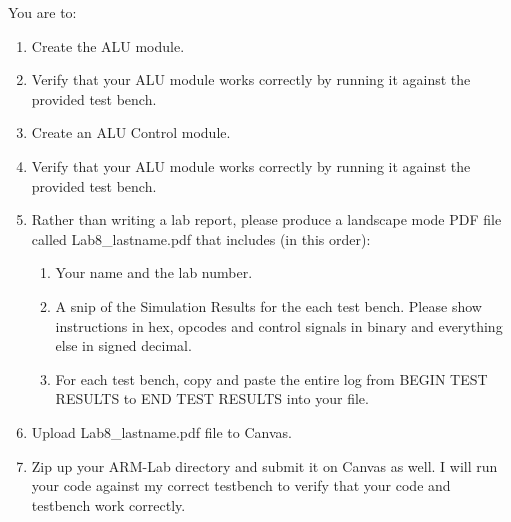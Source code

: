 You are to:
\begin{enumerate}
\item Create the ALU module.
\item Verify that your ALU module works correctly by running it against the provided test bench.
\item Create an ALU Control module.
\item Verify that your ALU module works correctly by running it against the provided test bench.
\item Rather than writing a lab report, please produce a landscape mode PDF file called Lab8\_lastname.pdf that includes (in this order):
\begin{enumerate}
	\item Your name and the lab number.
	\item A snip of the Simulation Results for the each test bench.  Please show instructions in hex, opcodes and control signals in binary and everything else in signed decimal.  
	\item For each test bench, copy and paste the entire log from BEGIN TEST RESULTS to END TEST RESULTS into your file.	
\end{enumerate}
\item Upload Lab8\_lastname.pdf file to Canvas.
\item Zip up your ARM-Lab directory and submit it on Canvas as well.  I will run your code against my correct testbench to verify that your code and testbench work correctly.
\end{enumerate} 